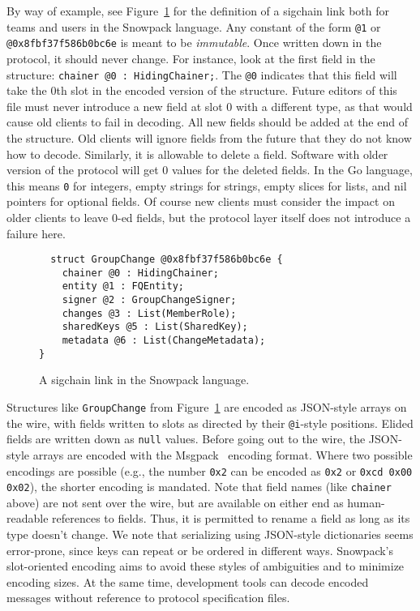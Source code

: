 By way of example, see Figure~\ref{fig:group-change} for the definition of a sigchain link both for teams
and users in the Snowpack language. Any constant of the form \texttt{@1} or \texttt{@0x8fbf37f586b0bc6e}
is meant to be \textit{immutable}. Once written down in the protocol, it should never change. For instance,
look at the first field in the structure: \texttt{chainer @0 : HidingChainer;}. The \texttt{@0} indicates that this
field will take the 0th slot in the encoded version of the structure. Future editors of this file must
never introduce a new field at slot 0 with a different type, as that would cause old clients to fail
in decoding. All new fields should be added at the end of the structure. Old clients will ignore fields
from the future that they do not know how to decode. Similarly, it is allowable to delete a field.
Software with older version of the protocol will get 0 values for the deleted fields. In the Go language,
this means \texttt{0} for integers, empty strings for strings, empty slices for lists, and nil 
pointers for optional fields. Of course new clients must consider the impact on older clients to 
leave 0-ed fields, but the protocol layer itself does not introduce a failure here.

\begin{figure}[ht]
  \centering
\begin{verbatim}
  struct GroupChange @0x8fbf37f586b0bc6e {
    chainer @0 : HidingChainer;
    entity @1 : FQEntity;
    signer @2 : GroupChangeSigner;
    changes @3 : List(MemberRole);
    sharedKeys @5 : List(SharedKey);
    metadata @6 : List(ChangeMetadata);
}
\end{verbatim}
\caption{A sigchain link in the Snowpack language.}
\label{fig:group-change}
\end{figure}

Structures like \texttt{GroupChange} from Figure~\ref{fig:group-change} are
encoded as JSON-style arrays on the wire, with fields written to slots as
directed by their \texttt{@i}-style positions. Elided fields are written down as
\texttt{null} values. Before going out to the wire, the JSON-style arrays are
encoded with the Msgpack~\cite{msgpack} encoding format. Where two possible
encodings are possible (e.g., the number \texttt{0x2} can be encoded as
\texttt{0x2} or \texttt{0xcd 0x00 0x02}), the shorter encoding is mandated. Note
that field names (like \texttt{chainer} above) are not sent over the wire, but
are available on either end as human-readable references to fields. Thus, it is
permitted to rename a field as long as its type doesn't change. We note that
serializing using JSON-style dictionaries seems error-prone, since keys can
repeat or be ordered in different ways. Snowpack's slot-oriented encoding aims
to avoid these styles of ambiguities and to minimize encoding sizes. At the same
time, development tools can decode encoded messages without reference to
protocol specification files.

